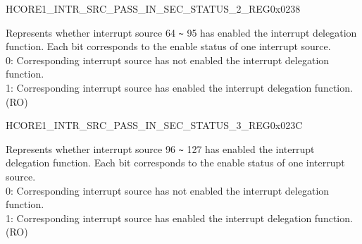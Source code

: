 \begin{register}{H}{CORE1\_INTR\_SRC\_PASS\_IN\_SEC\_STATUS\_2\_REG}{0x0238}\label{regdesc:CORE1INTRSRCPASSINSECSTATUS2REG}
%
\regnewline%
\begin{regdesc}\begin{reglist}
\label{fielddesc:CORE1INTRSRCPASSINSECSTATUS2}\item [CORE1\_INTR\_SRC\_PASS\_IN\_SEC\_STATUS\_2] Represents whether interrupt source 64 \verb+~+ 95 has enabled the interrupt delegation function. Each bit corresponds to the enable status of one interrupt source.\\
0: Corresponding interrupt source has not enabled the interrupt delegation function.\\
1: Corresponding interrupt source has enabled the interrupt delegation function.\\
(RO)
\end{reglist}\end{regdesc}
\end{register}

\begin{register}{H}{CORE1\_INTR\_SRC\_PASS\_IN\_SEC\_STATUS\_3\_REG}{0x023C}\label{regdesc:CORE1INTRSRCPASSINSECSTATUS3REG}
%
\regnewline%
\begin{regdesc}\begin{reglist}
\label{fielddesc:CORE1INTRSRCPASSINSECSTATUS3}\item [CORE1\_INTR\_SRC\_PASS\_IN\_SEC\_STATUS\_3] Represents whether interrupt source 96 \verb+~+ 127 has enabled the interrupt delegation function. Each bit corresponds to the enable status of one interrupt source.\\
0: Corresponding interrupt source has not enabled the interrupt delegation function.\\
1: Corresponding interrupt source has enabled the interrupt delegation function.\\
(RO)
\end{reglist}\end{regdesc}
\end{register}

